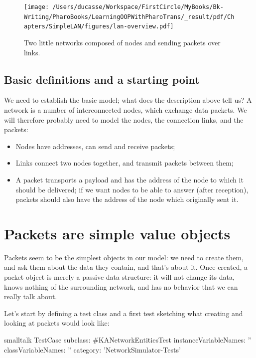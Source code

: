 \documentclass[10pt,twoside,english]{_support/latex/sbabook/sbabook}
\begin{document}
\begin{figure}

\begin{center}
\texttt{[image: /Users/ducasse/Workspace/FirstCircle/MyBooks/Bk-Writing/PharoBooks/LearningOOPWithPharoTrans/\_result/pdf/Chapters/SimpleLAN/figures/lan-overview.pdf]}\caption{Two little networks composed of nodes and sending packets over links.\label{/Users/ducasse/Workspace/FirstCircle/MyBooks/Bk-Writing/PharoBooks/LearningOOPWithPharoTrans/_result/pdf/Chapters/SimpleLAN/figures/lan-overview.pdf}}\end{center}
\end{figure}

\subsection{Basic definitions and a starting point}
We need to establish the basic model; what does the description above tell us?
A network is a number of interconnected nodes, which exchange data packets.
We will therefore probably need to model the nodes, the connection links, and the packets:

\begin{itemize}
\item Nodes have addresses, can send and receive packets;
\item Links connect two nodes together, and transmit packets between them;
\item A packet transports a payload and has the address of the node to which it should be delivered; if we want nodes to be able to answer (after reception), packets should also have the address of the node which originally sent it.
\end{itemize}
\section{Packets are simple value objects}
Packets seem to be the simplest objects in our model: we need to create them, and ask them about the data they contain, and that's about it.
Once created, a packet object is merely a passive data structure: it will not change its data, knows nothing of the surrounding network, and has no behavior that we can really talk about.

Let's start by defining a test class and a first test sketching what creating and looking at packets would look like:

\begin{displaycode}{smalltalk}
TestCase subclass: #KANetworkEntitiesTest
    instanceVariableNames: ''
    classVariableNames: ''
    category: 'NetworkSimulator-Tests'
\end{displaycode}
\end{document}
